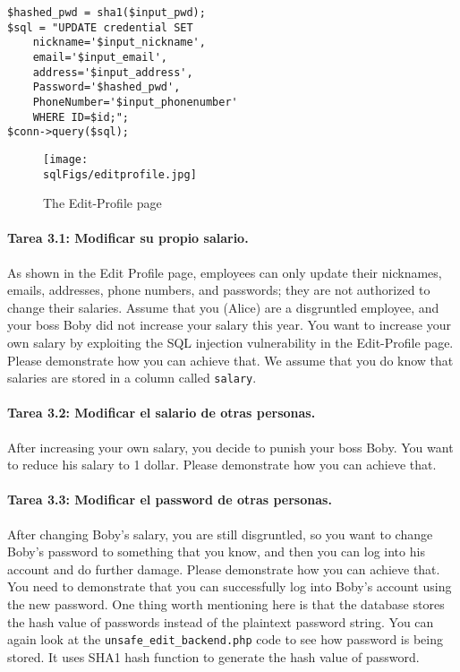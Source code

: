 \begin{lstlisting}
$hashed_pwd = sha1($input_pwd);
$sql = "UPDATE credential SET
	nickname='$input_nickname',
	email='$input_email',
	address='$input_address',
	Password='$hashed_pwd',
	PhoneNumber='$input_phonenumber'
	WHERE ID=$id;";
$conn->query($sql);
\end{lstlisting}
 

\begin{figure}[htb]
\begin{center}
  \texttt{[image: \\sqlFigs/editprofile.jpg]}
\end{center}
\caption{The Edit-Profile page}
\label{sql:fig:edit}
\end{figure}
 


\paragraph{Tarea 3.1: Modificar su propio salario.}  
As shown in the Edit Profile page,
employees can only update their nicknames, emails, addresses, phone numbers, and
passwords; they are not authorized to change their salaries.  
Assume that you (Alice) are a disgruntled employee, and your boss Boby did not 
increase your salary this year. You want to increase your own salary 
by exploiting the SQL injection vulnerability in
the Edit-Profile page. Please demonstrate how you can achieve that.
We assume that you do know that salaries are stored in 
a column called \texttt{salary}.


\paragraph{Tarea 3.2: Modificar el salario de otras personas.}
After increasing your own salary, you decide to punish your boss Boby. You want to reduce his
salary to 1 dollar. Please demonstrate how you can achieve that. 



\paragraph{Tarea 3.3: Modificar el password de otras personas.}
After changing Boby's salary, you are still disgruntled, so you
want to change Boby's password to something that you know, and then you can log into his account
and do further damage. Please demonstrate how you can achieve that.
You need to demonstrate that you can 
successfully log into Boby's account using the new
password.  One thing worth mentioning here is that the database stores the hash value of
passwords instead of the plaintext password string. You can again look at
the {\tt unsafe\_edit\_backend.php} code to see how password is being stored. It
uses SHA1 hash function to generate the hash value of password. 




